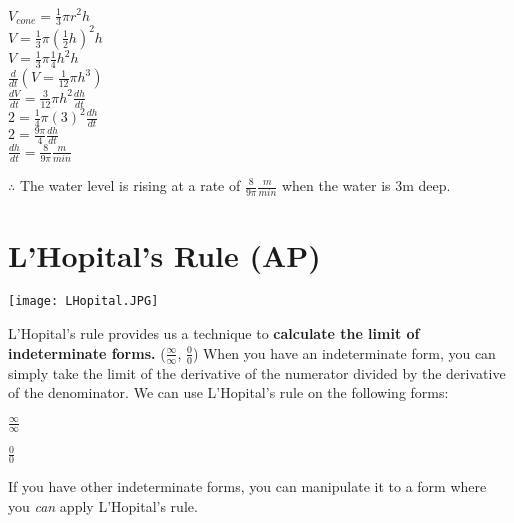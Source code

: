 \documentclass[12pt,fleqn]{book} %
\begin{document}
\begin{center}
    $V_{cone}=\frac{1}{3} \pi r^2 h$ \\
    \vspace*{2mm}
    $V=\frac{1}{3} \pi (\frac{1}{2}h)^2 h$ \\
    \vspace*{2mm}
    $V=\frac{1}{3} \pi \frac{1}{4}h^2h$\\
    \vspace*{2mm}
    $\frac{d}{dt}(V=\frac{1}{12} \pi h^3)$ \\
    \vspace*{2mm}
    $\frac{dV}{dt}=\frac{3}{12} \pi h^2 \frac{dh}{dt}$ \\
    \vspace*{2mm}
    $2=\frac{1}{4} \pi (3)^2 \frac{dh}{dt}$ \\
    \vspace*{2mm}
    $2=\frac{9 \pi}{4} \frac{dh}{dt}$ \\
    \vspace*{2mm}
    $\frac{dh}{dt}=\frac{8}{9 \pi} \frac{m}{min}$
\end{center}

\noindent $\therefore$ The water level is rising at a rate of $\frac{8}{9 \pi} \frac{m}{min}$ when the water is 3m deep.

\section{L'Hopital's Rule (AP)}

\texttt{[image: LHopital.JPG]}

\noindent L'Hopital's rule provides us a technique to \textbf{calculate the limit of indeterminate forms.} ($\frac{\infty}{\infty}$, $\frac{0}{0}$) When you have an indeterminate form, you can simply take the limit
of the derivative of the numerator divided by the derivative of the denominator. We can use L'Hopital's rule on the following forms:

\begin{multicols}{2}
    \begin{center}
        {\large$\frac{\infty}{\infty}$

            $\frac{0}{0}$}
    \end{center}
\end{multicols}

\noindent If you have other indeterminate forms, you can manipulate it to a form where you \emph{can} apply L'Hopital's rule. \\
\end{document}

